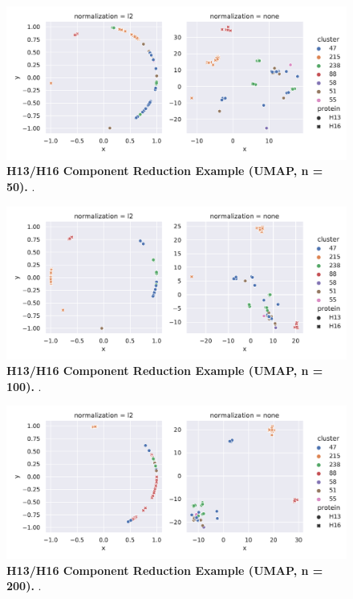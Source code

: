 \begin{figure}[!hbt]
    \centering
    \includegraphics[width=\textwidth]{UMAP/Difference_Segment_4_H_UMAP_Neighbors_50.pdf}
    \caption[H13/H16 Component Reduction Example (\Acrshort{UMAP}, n = 50)]{\textbf{H13/H16 Component Reduction Example (\Acrshort{UMAP}, n = 50).} .}
    \label{fig:Reduction_Example_UMAP_50}
\end{figure}

\begin{figure}[!hbt]
    \centering
    \includegraphics[width=\textwidth]{UMAP/Difference_Segment_4_H_UMAP_Neighbors_100.pdf}
    \caption[H13/H16 Component Reduction Example (\Acrshort{UMAP}, n = 100)]{\textbf{H13/H16 Component Reduction Example (\Acrshort{UMAP}, n = 100).} .}
    \label{fig:Reduction_Example_UMAP_100}
\end{figure}

\begin{figure}[!hbt]
    \centering
    \includegraphics[width=\textwidth]{UMAP/Difference_Segment_4_H_UMAP_Neighbors_200.pdf}
    \caption[H13/H16 Component Reduction Example (\Acrshort{UMAP}, n = 200)]{\textbf{H13/H16 Component Reduction Example (\Acrshort{UMAP}, n = 200).} .}   \label{fig:Reduction_Example_UMAP_200}
\end{figure}

